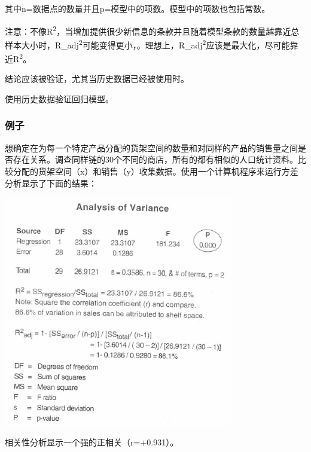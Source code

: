 其中n=数据点的数量并且p=模型中的项数。模型中的项数也包括常数。

注意：不像R\textsuperscript{2}，当增加提供很少新信息的条款并且随着模型条款的数量越靠近总样本大小时，R\_adj\textsuperscript{2}可能变得更小，。理想上，R\_adj\textsuperscript{2}应该是最大化，尽可能靠近R\textsuperscript{2}。

结论应该被验证，尤其当历史数据已经被使用时。

使用历史数据验证回归模型。


\hypertarget{ux80ccux666f}{%
\subsubsection{例子}\label{ux80ccux666f}}

想确定在为每一个特定产品分配的货架空间的数量和对同样的产品的销售量之间是否存在关系。调查同样链的30个不同的商店，所有的都有相似的人口统计资料。比较分配的货架空间（x）和销售（y）收集数据。使用一个计算机程序来运行方差分析显示了下面的结果：


\includegraphics[width=10cm]{相关性12.png}

相关性分析显示一个强的正相关（r=+0.931）。


